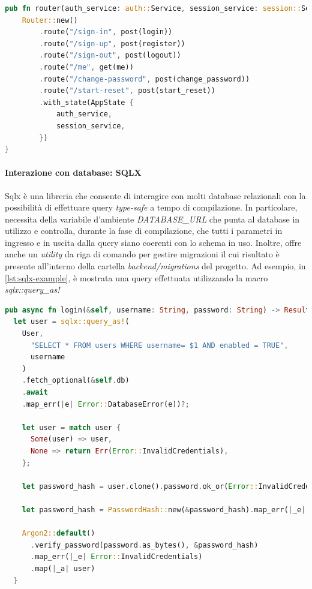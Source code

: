 \documentclass{article}
\begin{document}
\begin{lstlisting}[language=Rust, style=boxed, label={lst:axum-router-example}, captionpos=b,caption={Esempio di router in Axum}]
pub fn router(auth_service: auth::Service, session_service: session::Service) -> Router {
    Router::new()
        .route("/sign-in", post(login))
        .route("/sign-up", post(register))
        .route("/sign-out", post(logout))
        .route("/me", get(me))
        .route("/change-password", post(change_password))
        .route("/start-reset", post(start_reset))
        .with_state(AppState {
            auth_service,
            session_service,
        })
}
\end{lstlisting}

\paragraph{Interazione con database: SQLX} Sqlx è una libreria che consente di interagire 
con molti database relazionali con la possibilità di effettuare query \textit{type-safe}
a tempo di compilazione. In particolare, necessita della variabile d'ambiente
\textit{DATABASE\_URL} che punta al database in utilizzo e controlla, durante la fase di 
compilazione, che tutti i parametri in ingresso e in uscita dalla query siano coerenti con lo 
schema in uso. Inoltre, offre anche un \textit{utility} da riga di comando per gestire migrazioni 
il cui risultato è presente all'interno della cartella \textit{backend/migrations} del progetto. 
Ad esempio, in \cref{lst:sqlx-example}, è mostrata una query effettuata utilizzando la macro \textit{sqlx::query\_as!}

\begin{lstlisting}[language=Rust, style=boxed, label={lst:sqlx-example}, captionpos=b,caption={Esempio di query in Rust con SQLX: il compilatore assicura che il tipo della variabile \textit{username} sia compatibile con quello del campo della tabella}]
pub async fn login(&self, username: String, password: String) -> Result<User> {
  let user = sqlx::query_as!(
    User,
      "SELECT * FROM users WHERE username= $1 AND enabled = TRUE",
      username
    )
    .fetch_optional(&self.db)
    .await
    .map_err(|e| Error::DatabaseError(e))?;

    let user = match user {
      Some(user) => user,
      None => return Err(Error::InvalidCredentials),
    };

    let password_hash = user.clone().password.ok_or(Error::InvalidCredentials)?;

    let password_hash = PasswordHash::new(&password_hash).map_err(|_e| Error::CryptoError)?;

    Argon2::default()
      .verify_password(password.as_bytes(), &password_hash)
      .map_err(|_e| Error::InvalidCredentials)
      .map(|_a| user)
  }

\end{lstlisting}
\end{document}
